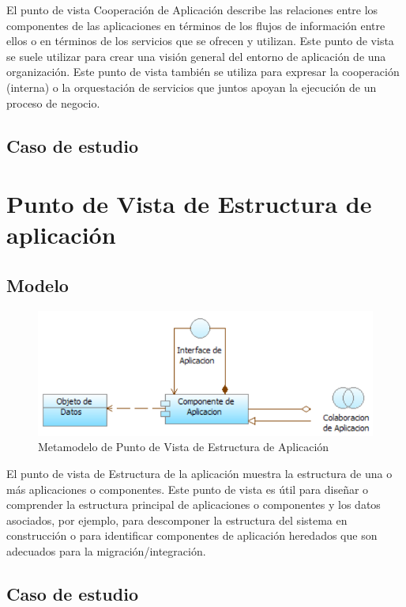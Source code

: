 El punto de vista Cooperación de Aplicación describe las relaciones entre los componentes de las aplicaciones en términos de los flujos de información entre ellos o en términos de los servicios que se ofrecen y utilizan. Este punto de vista se suele utilizar para crear una visión general del entorno de aplicación de una organización. Este punto de vista también se utiliza para expresar la cooperación (interna) o la orquestación de servicios que juntos apoyan la ejecución de un proceso de negocio.

\subsection{Caso de estudio}

\newpage

\section{Punto de Vista de Estructura de aplicación}

\subsection{Modelo}

\begin{figure}[th!]
	\centering
	\includegraphics[width=0.7\linewidth]{arquitectura/imagenes/modeloEstructuraAplicacion}
	\caption{Metamodelo de Punto de Vista de Estructura de Aplicación \cite{pun9}}
	\label{fig:metamodelo de punto de vista de estructura de aplicación}
\end{figure}
El punto de vista de Estructura de la aplicación muestra la estructura de una o más aplicaciones o componentes. Este punto de vista es útil para diseñar o comprender la estructura principal de aplicaciones o componentes y los datos asociados, por ejemplo, para descomponer la estructura del sistema en construcción o para identificar componentes de aplicación heredados que son adecuados para la migración/integración.

\subsection{Caso de estudio}

